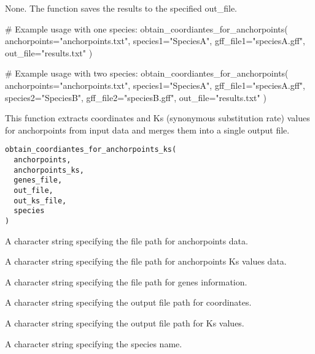 \documentclass[a4paper]{book}
\begin{document}
%
\begin{Value}
None. The function saves the results to the specified out\_file.
\end{Value}
%
\begin{Examples}
\begin{ExampleCode}
# Example usage with one species:
obtain_coordiantes_for_anchorpoints(
  anchorpoints="anchorpoints.txt",
  species1="SpeciesA",
  gff_file1="speciesA.gff",
  out_file="results.txt"
)

# Example usage with two species:
obtain_coordiantes_for_anchorpoints(
  anchorpoints="anchorpoints.txt",
  species1="SpeciesA",
  gff_file1="speciesA.gff",
  species2="SpeciesB",
  gff_file2="speciesB.gff",
  out_file="results.txt"
)
\end{ExampleCode}
\end{Examples}
%
\begin{Description}\relax
This function extracts coordinates and Ks (synonymous substitution rate) values for anchorpoints
from input data and merges them into a single output file.
\end{Description}
%
\begin{Usage}
\begin{verbatim}
obtain_coordiantes_for_anchorpoints_ks(
  anchorpoints,
  anchorpoints_ks,
  genes_file,
  out_file,
  out_ks_file,
  species
)
\end{verbatim}
\end{Usage}
%
\begin{Arguments}
\begin{ldescription}
\item[\code{anchorpoints}] A character string specifying the file path for anchorpoints data.

\item[\code{anchorpoints\_ks}] A character string specifying the file path for anchorpoints Ks values data.

\item[\code{genes\_file}] A character string specifying the file path for genes information.

\item[\code{out\_file}] A character string specifying the output file path for coordinates.

\item[\code{out\_ks\_file}] A character string specifying the output file path for Ks values.

\item[\code{species}] A character string specifying the species name.
\end{ldescription}
\end{Arguments}
\end{document}
